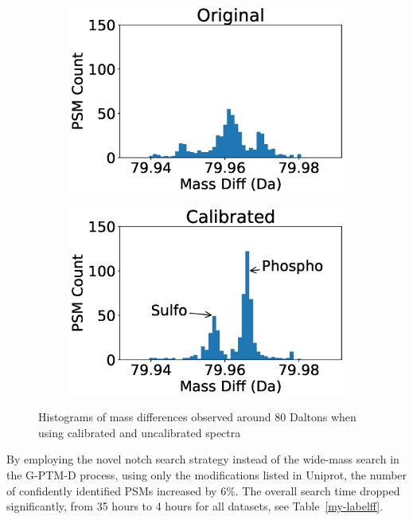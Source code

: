 \documentclass[journal=jprobs,manuscript=article]{achemso}
\begin{document}
\begin{figure}	
	\centering
	\begin{subfigure}[t]{3.1in}
		\centering
		\includegraphics[scale=0.5]{figPhosphorylationPre.eps}
		\label{fig:1a}		
	\end{subfigure}
	\quad
	\begin{subfigure}[t]{3.1in}
		\centering
		\includegraphics[scale=0.5]{figPhosphorylationCalib.eps}
		\label{fig:1b}
	\end{subfigure}
	\caption{Histograms of mass differences observed around 80 Daltons when using calibrated and uncalibrated spectra}\label{fig:phosphoHistograms}
\end{figure}

By employing the novel notch search strategy instead of the wide-mass search in the G-PTM-D process, using only the modifications listed in Uniprot, the number of confidently identified PSMs increased by 6\%.
The overall search time dropped significantly, from 35 hours to 4 hours for all datasets, see Table~\ref{my-labelff}.
\end{document}
